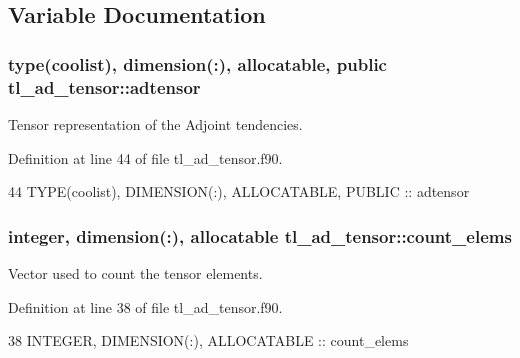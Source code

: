 \subsection{Variable Documentation}
\subsubsection[{\texorpdfstring{adtensor}{adtensor}}]{\setlength{\rightskip}{0pt plus 5cm}type({\bf coolist}), dimension(\+:), allocatable, public tl\+\_\+ad\+\_\+tensor\+::adtensor}\hypertarget{namespacetl__ad__tensor_af0a4e6cdc6d653fa808eedaa7ce331de}{}\label{namespacetl__ad__tensor_af0a4e6cdc6d653fa808eedaa7ce331de}


Tensor representation of the Adjoint tendencies. 



Definition at line 44 of file tl\+\_\+ad\+\_\+tensor.\+f90.


\begin{DoxyCode}
44   \textcolor{keywordtype}{TYPE}(coolist), \textcolor{keywordtype}{DIMENSION(:)}, \textcolor{keywordtype}{ALLOCATABLE}, \textcolor{keywordtype}{PUBLIC} :: adtensor
\end{DoxyCode}
\subsubsection[{\texorpdfstring{count\+\_\+elems}{count_elems}}]{\setlength{\rightskip}{0pt plus 5cm}integer, dimension(\+:), allocatable tl\+\_\+ad\+\_\+tensor\+::count\+\_\+elems\hspace{0.3cm}{\ttfamily [private]}}\hypertarget{namespacetl__ad__tensor_a8836f34c3a96c44c487c7910ab8c7507}{}\label{namespacetl__ad__tensor_a8836f34c3a96c44c487c7910ab8c7507}


Vector used to count the tensor elements. 



Definition at line 38 of file tl\+\_\+ad\+\_\+tensor.\+f90.


\begin{DoxyCode}
38   \textcolor{keywordtype}{INTEGER}, \textcolor{keywordtype}{DIMENSION(:)}, \textcolor{keywordtype}{ALLOCATABLE} :: count\_elems
\end{DoxyCode}
